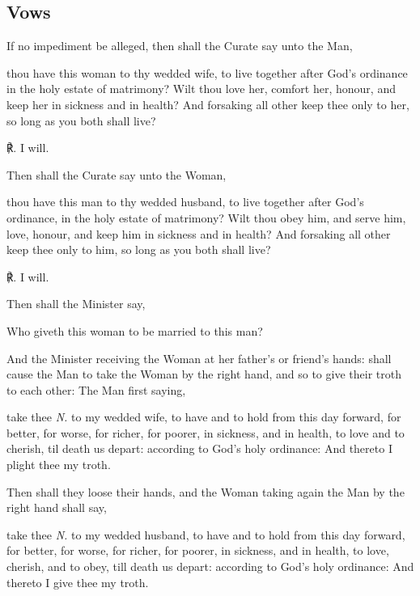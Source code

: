 \subsection{Vows}
\begin{rubric}
    If no impediment be alleged, then shall the Curate say unto the Man,
\end{rubric}
 thou have this woman to thy wedded wife, to live together after God's ordinance in the holy estate of matrimony? Wilt thou love her, comfort her, honour, and keep her in sickness and in health? And forsaking all other keep thee only to her, so long as you both shall live?\par
℟. I will.\par
\begin{rubric}
	Then shall the Curate say unto the Woman,
\end{rubric}
 thou have this man to thy wedded husband, to live together after God's ordinance, in the holy estate of matrimony? Wilt thou obey him, and serve him, love, honour, and keep him in sickness and in health? And forsaking all other keep thee only to him, so long as you both shall live?\par
℟. I will.\par
\begin{rubric}
	Then shall the Minister say,
\end{rubric}\noindent
Who giveth this woman to be married to this man?
\begin{rubric}
	And the Minister receiving the Woman at her father's or friend's hands: shall cause the Man to take the Woman by the right hand, and so to give their troth to each other: The Man first saying,
\end{rubric}
 take thee \textit{N.} to my wedded wife, to have and to hold from this day forward, for better, for worse, for richer, for poorer, in sickness, and in health, to love and to cherish, 
til death us depart: according to God's holy ordinance: And thereto I plight thee my troth.
\begin{rubric}
	Then shall they loose their hands, and the Woman taking again the Man by the right hand shall say,
\end{rubric}
 take thee \textit{N.} to my wedded husband, to have and to hold from this day forward, for better, for worse, for richer, for poorer, in sickness, and in health, to love, cherish, and to obey, till death us depart: according to God's holy ordinance: And thereto I give thee my troth.

